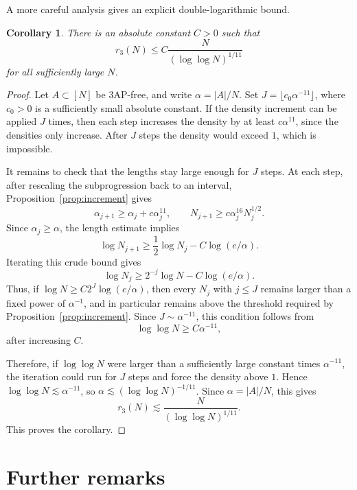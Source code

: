 \documentclass[11pt]{amsart}
\newcommand{\abs}[1]{\lvert#1\rvert}
\numberwithin{equation}{section}
\theoremstyle{plain}
\newtheorem{corollary}[theorem]{Corollary}
\theoremstyle{remark}
\begin{document}
A more careful analysis  gives an explicit double-logarithmic bound.

\begin{corollary}\label{cor:quantitative}
There is an absolute constant $C>0$ such that
$$
        r_3(N)\leq C\frac{N}{(\log\log N)^{1/11}}
$$
for all sufficiently large $N$.
\end{corollary}

\begin{proof}
Let $A\subset[N]$ be 3AP-free, and write $\alpha=\abs{A}/N$. Set
$J=\lfloor c_0\alpha^{-11}\rfloor$, where $c_0>0$ is a sufficiently small
absolute constant. If the density increment can be applied $J$ times, then each
step increases the density by at least $c\alpha^{11}$, since the densities only
increase. After $J$ steps the density would exceed $1$, which is impossible.

It remains to check that the lengths stay large enough for $J$ steps. At each
step, after rescaling the subprogression back to an interval,
Proposition~\ref{prop:increment} gives
\[
        \alpha_{j+1}\geq \alpha_j+c\alpha_j^{11},
        \qquad
        N_{j+1}\geq c\alpha_j^{16}N_j^{1/2}.
\]
Since $\alpha_j\geq\alpha$, the length estimate implies
\[
        \log N_{j+1}\geq \frac12\log N_j-C\log(e/\alpha).
\]
Iterating this crude bound gives
\[
        \log N_j\geq 2^{-j}\log N-C\log(e/\alpha).
\]
Thus, if $\log N\geq C2^J\log(e/\alpha)$, then every $N_j$ with $j\leq J$
remains larger than a fixed power of $\alpha^{-1}$, and in particular remains
above the threshold required by Proposition~\ref{prop:increment}. Since
$J\sim\alpha^{-11}$, this condition follows from
\[
        \log\log N\geq C\alpha^{-11},
\]
after increasing $C$.

Therefore, if $\log\log N$ were larger than a sufficiently large constant times
$\alpha^{-11}$, the iteration could run for $J$ steps and force the density
above $1$. Hence $\log\log N\lesssim\alpha^{-11}$, so
$\alpha\lesssim(\log\log N)^{-1/11}$. Since $\alpha=\abs{A}/N$, this gives
\[
        r_3(N)\lesssim \frac{N}{(\log\log N)^{1/11}}.
\]
This proves the corollary.
\end{proof}

\section{Further remarks}
\end{document}
